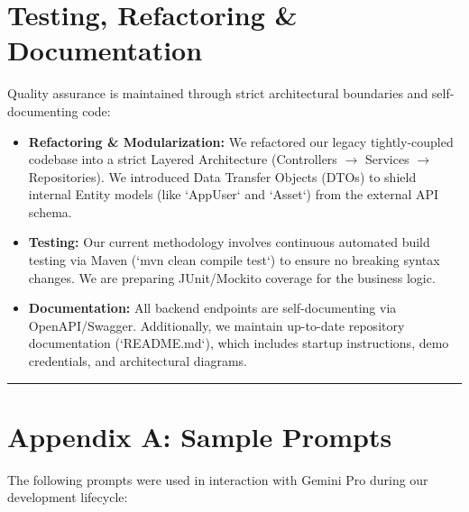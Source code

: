 \documentclass[11pt,a4paper]{article}
\begin{document}
\section{Testing, Refactoring \& Documentation}
Quality assurance is maintained through strict architectural boundaries and self-documenting code:
\begin{itemize}[noitemsep]
    \item \textbf{Refactoring \& Modularization:} We refactored our legacy tightly-coupled codebase into a strict Layered Architecture (Controllers $\rightarrow$ Services $\rightarrow$ Repositories). We introduced Data Transfer Objects (DTOs) to shield internal Entity models (like `AppUser` and `Asset`) from the external API schema.
    \item \textbf{Testing:} Our current methodology involves continuous automated build testing via Maven (`mvn clean compile test`) to ensure no breaking syntax changes. We are preparing JUnit/Mockito coverage for the business logic.
    \item \textbf{Documentation:} All backend endpoints are self-documenting via OpenAPI/Swagger. Additionally, we maintain up-to-date repository documentation (`README.md`), which includes startup instructions, demo credentials, and architectural diagrams.
\end{itemize}

\vspace{1cm}
\hrule
\vspace{0.5cm}

\appendix
\section{Appendix A: Sample Prompts}
The following prompts were used in interaction with Gemini Pro during our development lifecycle:
\end{document}

